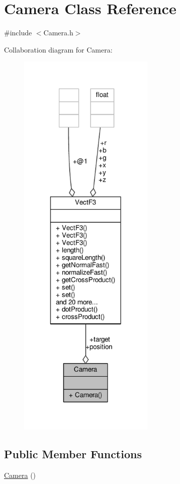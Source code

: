 \hypertarget{classCamera}{\section{Camera Class Reference}
\label{classCamera}
}


{\ttfamily \#include $<$Camera.\-h$>$}



Collaboration diagram for Camera\-:
\nopagebreak
\begin{figure}[H]
\begin{center}
\leavevmode
\includegraphics[width=184pt]{classCamera__coll__graph}
\end{center}
\end{figure}
\subsection*{Public Member Functions}
\begin{DoxyCompactItemize}
\item 
\hyperlink{classCamera_a01f94c3543f56ede7af49dc778f19331}{Camera} ()
\end{DoxyCompactItemize}
